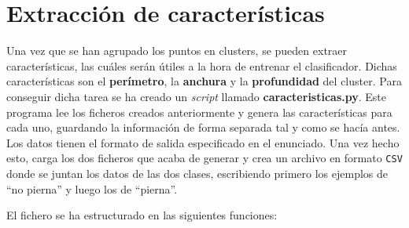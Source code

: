 \documentclass[11pt,a4paper]{article}
\begin{document}
\section{Extracción de características}

Una vez que se han agrupado los puntos en clusters, se pueden extraer características,
las cuáles serán útiles a la hora de entrenar el clasificador. Dichas características son
el \textbf{perímetro}, la \textbf{anchura} y la \textbf{profundidad} del cluster.
Para conseguir dicha tarea
se ha creado un \textit{script} llamado \textbf{caracteristicas.py}. Este programa lee
los ficheros creados anteriormente y genera las características para cada uno, guardando
la información de forma separada tal y como se hacía antes. Los datos tienen el formato
de salida especificado en el enunciado. Una vez hecho esto, carga los dos ficheros
que acaba de generar y crea un archivo en formato \texttt{CSV} donde se juntan los
datos de las dos clases, escribiendo primero los ejemplos de ``no pierna'' y luego
los de ``pierna''.

El fichero se ha estructurado en las siguientes funciones:
\end{document}
